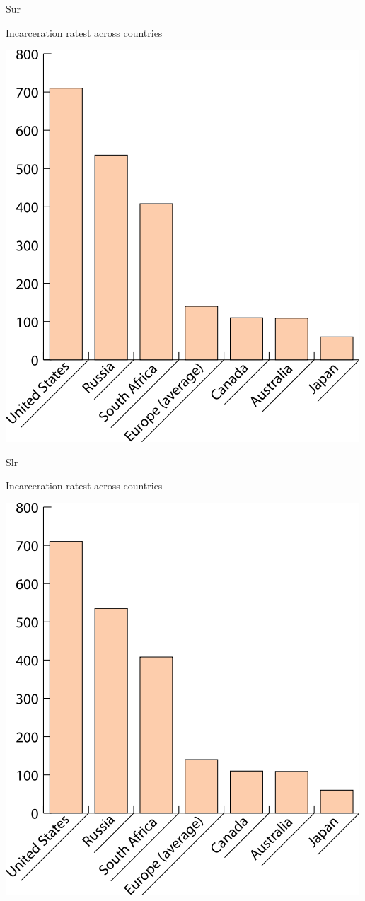 \begin{chart}{S}{ur}
\caption{Incarceration ratest across countries}
\label{chart:incarceration}
\includegraphics[width=\chartwidth,height=\chartheight]{incarceration}  
\end{chart}

\begin{chart}{S}{lr}
\caption{Incarceration ratest across countries}
\label{chart:incarceration}
\includegraphics[width=\chartwidth,height=\chartheight]{incarceration}  
\end{chart}

